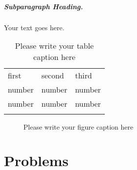 \subparagraph{Subparagraph Heading.} Your text goes here.%
%
%
%
\begin{table}
\centering
\caption{Please write your table caption here}
\label{tab:1}       %
%
%
\begin{tabular}{lll}
\hline\noalign{\smallskip}
first & second & third  \\
\noalign{\smallskip}\hline\noalign{\smallskip}
number & number & number \\
number & number & number \\
\noalign{\smallskip}\hline
\end{tabular}
\end{table}
%
%
%
\begin{figure}
\centering
%
%
\caption{Please write your figure caption here}
\label{fig:1}       %
\end{figure}

%
%
%
%
%
%
\section*{Problems}
%


